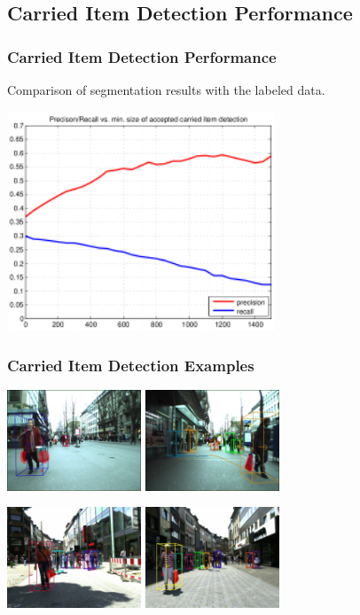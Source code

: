 \documentclass{beamer}
\begin{document}
\subsection{Carried Item Detection Performance}
\begin{frame}
\frametitle{Carried Item Detection Performance} 
Comparison of segmentation results with the labeled data.
\begin{center}
  	\includegraphics[width=8cm]{carried.pdf}
\end{center}

\end{frame}

\begin{frame}
\frametitle{Carried Item Detection Examples} 
\begin{center}
  	\includegraphics[width=4cm]{items1.jpg} \hspace{0.5cm}
  	\includegraphics[width=4cm]{items2.jpg}
\end{center}
\begin{center}
  	\includegraphics[width=4cm]{items3.jpg} \hspace{0.5cm}
  	\includegraphics[width=4cm]{items4.jpg}
\end{center}

\end{frame}
\end{document}

